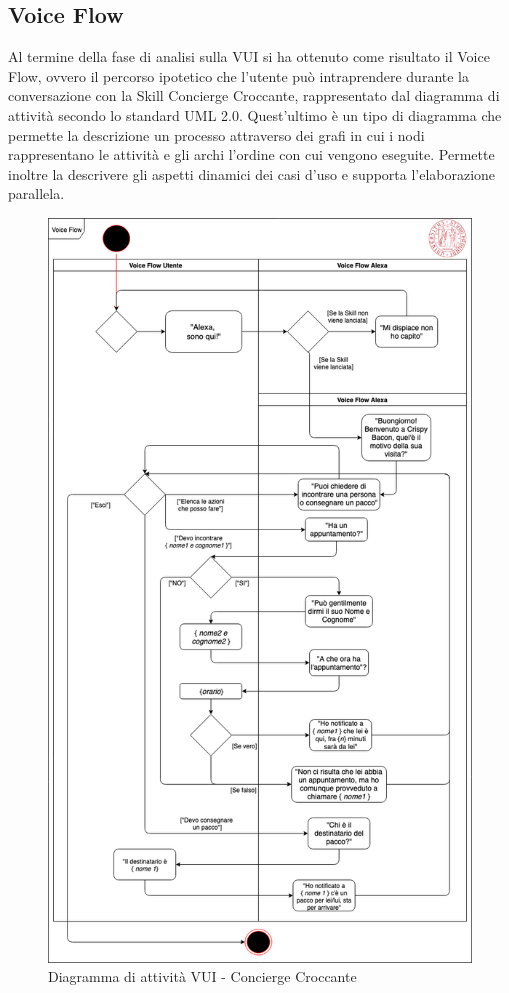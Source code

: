 \subsection{Voice Flow}
Al termine della fase di analisi sulla VUI si ha ottenuto come risultato il Voice Flow, ovvero il percorso ipotetico che l’utente può intraprendere durante la conversazione con la Skill Concierge Croccante, rappresentato dal diagramma di attività secondo lo standard UML 2.0. Quest'ultimo è un tipo di diagramma che permette la descrizione un processo attraverso dei grafi in cui i nodi rappresentano le attività e gli archi l'ordine con cui vengono eseguite. Permette inoltre la descrivere gli aspetti dinamici dei casi d'uso e supporta l'elaborazione parallela.
\begin{figure}[H] 
    \centering 
    \includegraphics[width=1\columnwidth]{immagini/attivita.png}
    \caption{\label{fig:voice_flow}Diagramma di attività VUI - Concierge Croccante}
\end{figure}

